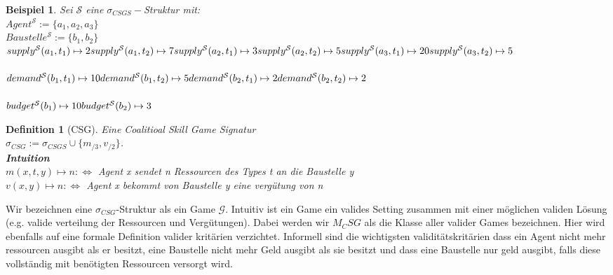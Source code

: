 \documentclass[12pt]{article}
\theoremstyle{break}
\newtheorem{definition}{Definition}
\newtheorem{bsp}{Beispiel}
\begin{document}
\begin{bsp}
  Sei $\mathcal{S}$ eine $\sigma_{CSGS}-$Struktur mit:\\
  $Agent^\mathcal{S} := \{a_1, a_2, a_3\}$ \\
  $Baustelle^\mathcal{S} := \{b_1, b_2\}$ \\
  $ \\
  supply^\mathcal{S}(a_1, t_1)\mapsto 2 \\
  supply^\mathcal{S}(a_1, t_2)\mapsto 7 \\
  supply^\mathcal{S}(a_2, t_1)\mapsto 3 \\
  supply^\mathcal{S}(a_2, t_2)\mapsto 5 \\
  supply^\mathcal{S}(a_3, t_1)\mapsto 20 \\
  supply^\mathcal{S}(a_3, t_2)\mapsto 5
  $ \\ \\
  $
  demand^\mathcal{S}(b_1, t_1)\mapsto 10 \\
  demand^\mathcal{S}(b_1, t_2)\mapsto 5\\
  demand^\mathcal{S}(b_2, t_1)\mapsto 2\\
  demand^\mathcal{S}(b_2, t_2)\mapsto 2
  $ \\ \\
  $
  budget^\mathcal{S}(b_1)\mapsto 10 \\
  budget^\mathcal{S}(b_2)\mapsto 3
  $ \\
\end{bsp}



\begin{definition}[CSG]
  Eine Coalitioal Skill Game Signatur \\$\sigma_{CSG}:=\sigma_{CSGS}\cup\{m_{/3}, v_{/2}\}$.
    \\ \textbf{Intuition} \\
    $m(x, t, y)\mapsto n:\Leftrightarrow$ Agent x sendet n Ressourcen des Types t an die Baustelle y \\
    $v(x,y)\mapsto n:\Leftrightarrow$ Agent x bekommt von Baustelle y eine vergütung von n
\end{definition}

Wir bezeichnen eine $\sigma_{CSG}$-Struktur als ein Game $\mathcal{G}$. Intuitiv ist ein Game ein valides Setting zusammen mit einer möglichen validen Lösung (e.g. valide verteilung der Ressourcen und Vergütungen).
Dabei werden wir $M_CSG$ als die Klasse aller valider Games bezeichnen. Hier wird ebenfalls auf eine formale Definition valider kritärien verzichtet. Informell sind die wichtigsten validitätskritärien dass ein Agent nicht mehr ressourcen ausgibt als er besitzt, eine Baustelle nicht mehr Geld ausgibt als sie besitzt und dass eine Baustelle nur geld ausgibt, falls diese vollständig mit benötigten Ressourcen versorgt wird.
\end{document}
